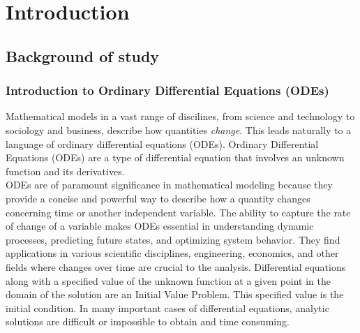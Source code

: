 \chapter{Introduction}
\label{ch:introduction}

\section{Background of study}
\label{sec:project-description}
\subsection{Introduction to Ordinary Differential Equations (ODEs)}
Mathematical models in a vast range of discilines, from science and technology to sociology and business, describe how quantities \textsl{change}. This leads naturally to a language of ordinary differential equations (ODEs).
Ordinary Differential Equations (ODEs) are a type of differential equation that involves an unknown function and its derivatives. \\
ODEs are of paramount significance in mathematical modeling because they provide a concise and powerful way to describe how a quantity changes concerning time or another independent variable. The ability to capture the rate of change of a variable makes ODEs essential in understanding dynamic processes, predicting future states, and optimizing system behavior. They find applications in various scientific disciplines, engineering, economics, and other fields where changes over time are crucial to the analysis. 
Differential equations along with a specified value of the unknown function at a given point in the domain of the solution are an Initial Value Problem. This specified value is the initial condition. In many important cases of differential equations, analytic solutions are difficult or impossible to obtain and time
consuming. \\

